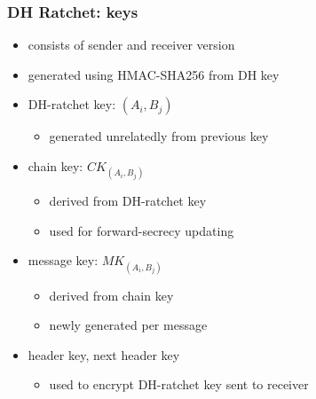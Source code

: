 \begin{frame}
	\frametitle{DH Ratchet: keys}

	\begin{itemize}
	\item	consists of sender and receiver version
	\item	generated using HMAC-SHA256 from DH key
	\vspace{5mm}
	\pause
	\item	DH-ratchet key: {\color{blue}$(A_i,B_j)$}
		\begin{itemize}
		\item	generated unrelatedly from previous key
		\end{itemize}
	\item	chain key: {\color{PineGreen}$CK_{(A_i,B_j)}$}
		\begin{itemize}
		\item	derived from DH-ratchet key %
		\item	used for forward-secrecy updating
		\end{itemize}
	\item	message key: {\color{red}$MK_{(A_i,B_j)}$}
		\begin{itemize}
		\item	derived from chain key %
		\item	newly generated per message
		\end{itemize}
	\pause
	\item	header key, next header key
		\begin{itemize}
		\item	used to encrypt DH-ratchet key sent to receiver
		\end{itemize}
	\end{itemize}
	
	
\end{frame}



